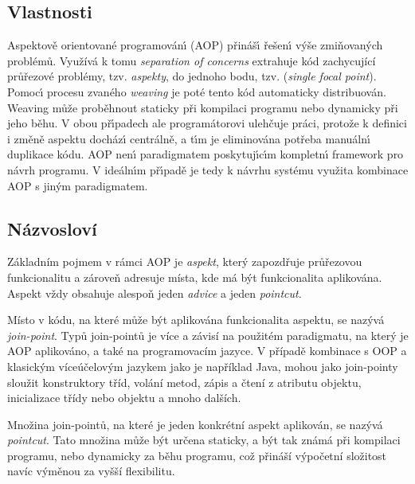 \subsection{Vlastnosti}
Aspektově orientované programován\'{\i} (\gls{AOP}) přináš\'{\i} řešen\'{\i}
v\'yše zmiňovaných problémů. Využívá k tomu \textit{separation of concerns} \textendash\xspace
extrahuje kód zachycující průřezové problémy, tzv. \textit{aspekty}, do jednoho bodu, tzv. (\textit{single focal point}).
Pomoc\'{\i} procesu zvaného \textit{weaving} je poté tento kód automaticky distribuován.
Weaving může proběhnout staticky při kompilaci programu nebo dynamicky
při jeho běhu. V obou př\'{\i}padech ale programátorovi ulehčuje práci,
protože k definici i změně aspektu docház\'{\i} centrálně, a t\'{\i}m je eliminována
potřeba manuáln\'{\i} duplikace kódu. \gls{AOP} nen\'{\i} paradigmatem poskytuj\'{\i}c\'{\i}m
kompletn\'{\i} framework pro návrh programu. V ideáln\'{\i}m př\'{\i}padě je tedy k návrhu
systému využita kombinace \gls{AOP} s jin\'ym paradigmatem.

\subsection{Názvosloví}

Základním pojmem v rámci \gls{AOP} je \textit{aspekt},
který zapozdřuje průřezovou funkcionalitu a zároveň adresuje místa, kde má být
funkcionalita aplikována. Aspekt vždy obsahuje alespoň jeden \textit{advice}
a jeden \textit{pointcut}.

Místo v kódu, na které může být aplikována funkcionalita aspektu, se nazývá
\textit{join-point}. Typů join-pointů je více a závisí na použitém paradigmatu,
na který je \gls{AOP} aplikováno, a také na programovacím jazyce. V případě
kombinace s \gls{OOP} a klasickým víceúčelovým jazykem jako je například Java,
mohou jako join-pointy sloužit konstruktory tříd, volání metod, zápis a čtení
z atributu objektu, inicializace třídy nebo objektu a mnoho dalších.

Množina join-pointů, na které je jeden konkrétní aspekt aplikován, se nazývá \textit{pointcut}.
Tato množina může být určena staticky, a být tak známá při kompilaci programu, nebo
dynamicky za běhu programu, což přináší výpočetní složitost navíc výměnou
za vyšší flexibilitu.

